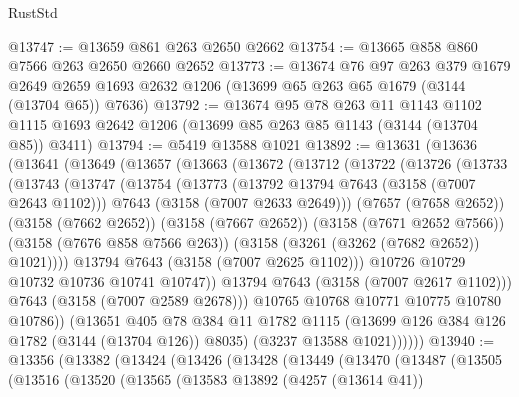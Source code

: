 \begin{lexlean}{RustStd}
\begin{coremodule}
{\begin{coremodule}
{{{{{{{{{{{{{{{{{{{{{{{{{{@13747 := @13659 @861 @263 @2650 @2662
@13754 := @13665 @858 @860 @7566 @263 @2650 @2660 @2652
@13773 := @13674
    @76
    @97
    @263
    @379
    @1679
    @2649
    @2659
    @1693
    @2632
    @1206
    (@13699 @65 @263 @65 @1679 (@3144 (@13704 @65)) @7636)
@13792 := @13674
    @95
    @78
    @263
    @11
    @1143
    @1102
    @1115
    @1693
    @2642
    @1206
    (@13699 @85 @263 @85 @1143 (@3144 (@13704 @85)) @3411)
@13794 := @5419 @13588 @1021
@13892 := @13631
    (@13636
      (@13641
        (@13649
          (@13657
            (@13663
              (@13672
                (@13712
                  (@13722
                    (@13726
                      (@13733
                        (@13743
                          (@13747
                            (@13754
                              (@13773
                                (@13792 @13794 @7643 (@3158 (@7007 @2643 @1102)))
                                @7643
                                (@3158 (@7007 @2633 @2649)))
                              (@7657 (@7658 @2652))
                              (@3158 (@7662 @2652))
                              (@3158 (@7667 @2652))
                              (@3158 (@7671 @2652 @7566))
                              (@3158 (@7676 @858 @7566 @263))
                              (@3158 (@3261 (@3262 (@7682 @2652)) @1021))))
                          @13794
                          @7643
                          (@3158 (@7007 @2625 @1102)))
                        @10726
                        @10729
                        @10732
                        @10736
                        @10741
                        @10747))
                    @13794
                    @7643
                    (@3158 (@7007 @2617 @1102)))
                  @7643
                  (@3158 (@7007 @2589 @2678)))
                @10765
                @10768
                @10771
                @10775
                @10780
                @10786))
            (@13651
              @405
              @78
              @384
              @11
              @1782
              @1115
              (@13699 @126 @384 @126 @1782 (@3144 (@13704 @126)) @8035)
              (@3237 @13588 @1021))))))
@13940 := @13356
    (@13382
      (@13424
        (@13426
          (@13428
            (@13449
              (@13470
                (@13487
                  (@13505
                    (@13516
                      (@13520
                        (@13565
                          (@13583
                            @13892
                            (@4257 (@13614 @41))
}}}}}}}}}}}}}}}}}}}}}}}}}}
\end{coremodule}}
\end{coremodule}
\end{lexlean}
